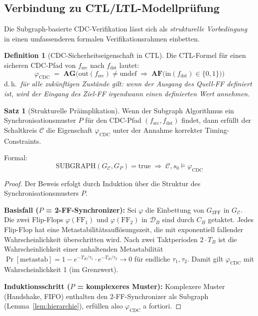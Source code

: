 ﻿\documentclass[a4paper,12pt]{article}
\theoremstyle{definition}
\newtheorem{definition}{Definition}
\newtheorem{satz}{Satz}
\begin{document}
	\subsection{Verbindung zu CTL/LTL-Modellpr\"ufung}
	
	Die Subgraph-basierte CDC-Verifikation l\"asst sich als
	\emph{strukturelle Vorbedingung} in einen umfassenderen
	formalen Verifikationsrahmen einbetten.
	
	\begin{definition}[CDC-Sicherheitseigenschaft in CTL]
		Die CTL-Formel f\"ur einen sicheren CDC-Pfad von $f_{\mathrm{src}}$ nach
		$f_{\mathrm{dst}}$ lautet:
		\[
		\varphi_{\mathrm{CDC}} \;=\;
		\mathbf{AG}\bigl(\mathrm{out}(f_{\mathrm{src}}) \neq \mathrm{undef}
		\;\Rightarrow\;
		\mathbf{AF}\bigl(\mathrm{in}(f_{\mathrm{dst}}) \in \{0, 1\}\bigr)\bigr)
		\]
		d.\,h.\ \emph{für alle zuk\"unftigen Zust\"ande gilt: wenn der Ausgang des
			Quell-FF definiert ist, wird der Eingang des Ziel-FF irgendwann
			einen definierten Wert annehmen.}
	\end{definition}
	
	\begin{satz}[Strukturelle Pr\"aimpl\-ikation]
		\label{satz:ctl}
		Wenn der Subgraph Algorithmus ein Synchronisationsmuster $P$ f\"ur den
		CDC-Pfad $(f_{\mathrm{src}}, f_{\mathrm{dst}})$ findet, dann erf\"ullt
		der Schaltkreis $\mathcal{C}$ die Eigenschaft $\varphi_{\mathrm{CDC}}$
		unter der Annahme korrekter Timing-Constraints.
		
		Formal:
		\[
		\mathrm{SUBGRAPH}(G_{\mathcal{C}}, G_P) = \mathrm{true}
		\;\Rightarrow\;
		\mathcal{C}, s_0 \models \varphi_{\mathrm{CDC}}
		\]
	\end{satz}
	
	\begin{proof}
		Der Beweis erfolgt durch Induktion \"uber die Struktur des Synchronisationsmusters $P$.
		
		\textbf{Basisfall ($P$ = 2-FF-Synchronizer):}
		Sei $\varphi$ die Einbettung von $G_{2\mathrm{FF}}$ in $G_{\mathcal{C}}$.
		Die zwei Flip-Flops $\varphi(\mathrm{FF}_1)$ und $\varphi(\mathrm{FF}_2)$
		in $\mathcal{D}_B$ sind durch $C_B$ getaktet. Jedes Flip-Flop hat eine
		Metastabilit\"atsaufl\"osungszeit, die mit exponentiell fallender
		Wahrscheinlichkeit \"uberschritten wird. Nach zwei Taktperioden $2 \cdot T_B$
		ist die Wahrscheinlichkeit einer anhaltenden Metastabilit\"at
		$\Pr[\text{metastab}] = 1 - e^{-T_B/\tau_1} \cdot e^{-T_B/\tau_2} \to 0$
		f\"ur endliche $\tau_1, \tau_2$. Damit gilt $\varphi_{\mathrm{CDC}}$
		mit Wahrscheinlichkeit 1 (im Grenzwert).
		
		\textbf{Induktionsschritt ($P$ = komplexeres Muster):}
		Komplexere Muster (Handshake, FIFO) enthalten den 2-FF-Synchronizer
		als Subgraph (Lemma~\ref{lem:hierarchie}), erf\"ullen also
		$\varphi_{\mathrm{CDC}}$ a fortiori. \qedhere
	\end{proof}
	
\end{document}
